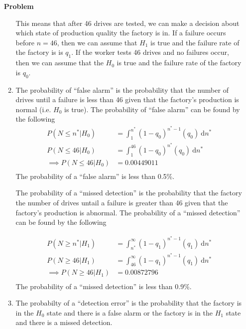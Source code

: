 \documentclass[12pt]{article}
\newenvironment{Ex}{\textbf{Problem}\vspace{.75em}\\}{}
\newcommand{\dd}[1]{\:\mathrm{d}{#1}}
\begin{document}
\begin{enumerate}
\begin{Ex}
\begin{solution}
\begin{enumerate}
        This means that after 46 drives are tested, we can make a
        decision about which state of production quality the factory
        is in. If a failure occurs before $n=46$, then we can assume
        that $H_1$ is true and the failure rate of the factory is is
        $q_1$. If the worker tests 46 drives and no failures occur,
        then we can assume that the $H_0$ is true and the failure rate
        of the factory is $q_0$.
      \item The probability of ``false alarm'' is the probability that
        the number of drives until a failure is less than 46 given
        that the factory's production is normal (i.e. $H_0$ is
        true). The probability of ``false alarm'' can be found by the
        following
        \begin{equation}
          \label{eq:1b-false-alarm}
          \begin{aligned}
            P(N\le n^*|H_0) &= \int_1^{n^*} (1-q_0)^{n^*-1}(q_0)\dd{n^*} \\
            P(N\le 46|H_0) &=\int_1^{46} (1-q_0)^{n^*}(q_0)\dd{n^*} \\
            \implies P(N\le 46|H_0) &= 0.00449011 \\
          \end{aligned}
        \end{equation}
        The probability of a ``false alarm'' is less than 0.5\%. 

        The probability of a ``missed detection'' is the probability
        that the factory the number of drives untail a failure is
        greater than 46 given that the factory's production is
        abnormal. The probability of a ``missed detection'' can be
        found by the following

        \begin{equation}
          \label{eq:1b-missed-detection}
          \begin{aligned}
            P(N\ge n^*|H_1) &= \int_{n^*}^{\infty}
            (1-q_1)^{n^*-1}(q_1)\dd{n^*} \\
            P(N\ge 46|H_1) &= \int_{46}^{\infty}
            (1-q_1)^{n^*-1}(q_1)\dd{n^*} \\
            \implies P(N\ge 46|H_1) &= 0.00872796 \\
          \end{aligned}
        \end{equation}
        The probability of a ``missed detection'' is less than 0.9\%.
      \item The probabilty of a ``detection error'' is the probability
        that the factory is in the $H_0$ state and there is a false
        alarm or the factory is in the $H_1$ state and there is a
        missed detection.


\end{enumerate}
\end{solution}
\end{Ex}
\end{enumerate}
\end{document}
